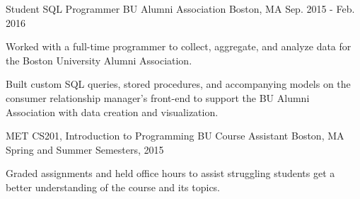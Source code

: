\begin{cventries}

\cventry
{Student SQL Programmer} %
{BU Alumni Association} %
{Boston, MA} %
{Sep. 2015 - Feb. 2016} %
{ %
\begin{cvitems}
\item {Worked with a full-time programmer to collect, aggregate, and analyze
data for the Boston University Alumni Association.}
\item {Built custom SQL queries, stored procedures, and accompanying models on
the consumer relationship manager's front-end to support the BU Alumni
Association with data creation and visualization.}
\end{cvitems}
}


\cventry
{MET CS201, Introduction to Programming} %
{BU Course Assistant} %
{Boston, MA} %
{Spring and Summer Semesters, 2015} %
{ %
\begin{cvitems}
\item {Graded assignments and held office hours to assist struggling students
get a better understanding of the course and its topics.}
\end{cvitems}
}


\end{cventries}

